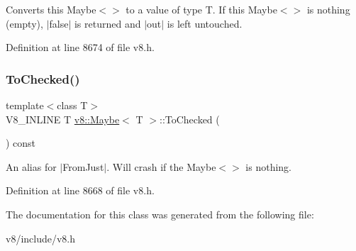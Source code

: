 Converts this Maybe$<$$>$ to a value of type T. If this Maybe$<$$>$ is nothing (empty), $\vert$false$\vert$ is returned and $\vert$out$\vert$ is left untouched. 

Definition at line 8674 of file v8.\+h.

\mbox{\label{classv8_1_1Maybe_abf2c0453c947f8c03f8e24b94887d33b}} 
\subsubsection{\texorpdfstring{To\+Checked()}{ToChecked()}}
{\footnotesize\ttfamily template$<$class T$>$ \\
V8\+\_\+\+I\+N\+L\+I\+NE T \mbox{\hyperlink{classv8_1_1Maybe}{v8\+::\+Maybe}}$<$ T $>$\+::To\+Checked (\begin{DoxyParamCaption}{ }\end{DoxyParamCaption}) const\hspace{0.3cm}{\ttfamily [inline]}}

An alias for $\vert$\+From\+Just$\vert$. Will crash if the Maybe$<$$>$ is nothing. 

Definition at line 8668 of file v8.\+h.



The documentation for this class was generated from the following file\+:\begin{DoxyCompactItemize}
\item 
v8/include/v8.\+h\end{DoxyCompactItemize}
